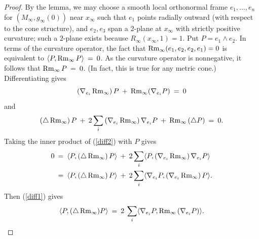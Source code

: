 \begin{proof}

By the lemma, we may choose a smooth local orthonormal
frame $e_1,\ldots,e_n$ for $(M_\infty,g_\infty(0))$
near $x_\infty$ such that $e_1$ points radially outward (with respect to the
cone structure), and $e_2,e_3$ span a $2$-plane at $x_\infty$ with strictly
positive curvature;
such a $2$-plane exists because $R_\infty(x_\infty, 1) = 1$.
Put $P = e_1 \wedge e_2$.
In terms of the curvature operator, the fact that
$\operatorname{Rm}_\infty(e_1,e_2,e_2,e_1)=0$ is equivalent to
$\langle P, \operatorname{Rm}_\infty P \rangle \: = \: 0$.
As the curvature operator is nonnegative, it follows that
$\operatorname{Rm}_\infty P \: = \: 0$. (In fact, this is true for any metric cone.)
Differentiating gives
\begin{equation} \label{diff1}
\left( \nabla_{e_i} \operatorname{Rm}_\infty \right) P \: + \: \operatorname{Rm}_\infty (\nabla_{e_i} P) \: = \: 0
\end{equation}
and
\begin{equation} \label{diff2}
\left( \triangle \operatorname{Rm}_\infty \right) P \: + \: 2 \sum_i \left( \nabla_{e_i} \operatorname{Rm}_\infty \right)
\nabla_{e_i} P \: + \: \operatorname{Rm}_\infty \left( \triangle P \right) \: = \: 0.
\end{equation}
Taking the inner product of (\ref{diff2}) with $P$ gives
\begin{align}
0 \: & = \: \langle P, \left( \triangle \operatorname{Rm}_\infty \right) P \rangle  \: + \: 2 \sum_i
\langle P, \left( \nabla_{e_i} \operatorname{Rm}_\infty \right)
\nabla_{e_i} P \rangle \\
& = \: \langle P, \left( \triangle \operatorname{Rm}_\infty \right) P \rangle  \: + \: 2 \sum_i
\langle \nabla_{e_i} P, \left( \nabla_{e_i} \operatorname{Rm}_\infty \right)
P \rangle. \notag
\end{align}
Then  (\ref{diff1}) gives
\begin{equation}
\langle P, (\triangle \operatorname{Rm}_\infty) P \rangle \: = \:  2 \:
\sum_i \langle \nabla_{e_i} P,  \operatorname{Rm}_\infty \left( \nabla_{e_i} P \right)  \rangle.
\end{equation}


\end{proof}
